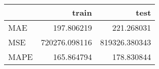 \begin{tabular}{lrr}
\toprule
{} &          train &           test \\
\midrule
MAE  &     197.806219 &     221.268031 \\
MSE  &  720276.098116 &  819326.380343 \\
MAPE &     165.864794 &     178.830844 \\
\bottomrule
\end{tabular}
